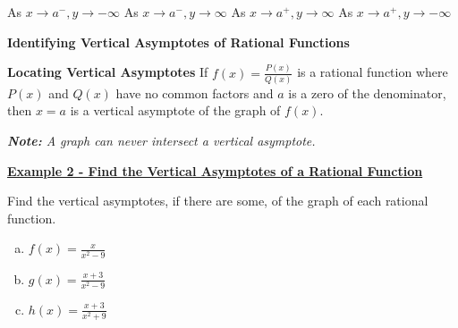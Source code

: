 \documentclass[12pt]{book}
\newcommand{\D}{\displaystyle}
\begin{document}
\begin{boxR}
\begin{multicols}{4}
\end{multicols}


As $x\to a^{-}, y \to -\infty$ \hspace{4mm} As $x \to a^{-}, y \to \infty$ \hspace{4mm} As $x \to a^+, y \to \infty$  \hspace{4mm} As $x \to a^+, y \to -\infty$  


\end{boxR}

\textbf{{\large Identifying Vertical Asymptotes of Rational Functions}}

\begin{boxR}
    \textbf{Locating Vertical Asymptotes}
    \vspace{1mm}
    \hline
    \vspace{2mm}
    If $\D f(x)=\frac{P(x)}{Q(x)}$ is a rational function where $P(x)$ and $Q(x)$ have no common factors and $a$ is a zero of the denominator, then $x=a$ is a vertical asymptote of the graph of $f(x)$.

   \textit{ \textbf{Note:} A graph can never intersect a vertical asymptote.}
\end{boxR}


\underline{\textbf{Example 2 - Find the Vertical Asymptotes of a Rational Function}}

Find the vertical asymptotes, if there are some, of the graph of each rational function. 

\begin{enumerate}[(a)]
    \item $\D f(x)=\frac{x}{x^2-9}$
    \vspace{30mm}
    
    \item $\D g(x)=\frac{x+3}{x^2-9}$
    \vspace{30mm}
    \item $\D h(x)= \frac{x+3}{x^2+9}$
\end{enumerate}
\end{document}
